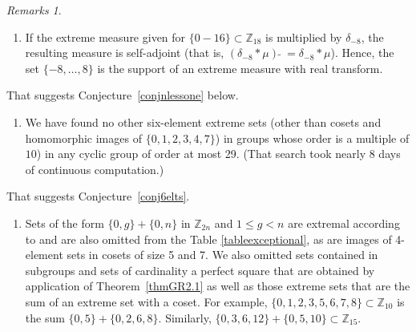 \documentclass[letter,11pt]{amsart}
\newcounter{keepenumi}%
\newcommand{\enumiget}{\setcounter{enumi}{\value{keepenumi}}}
\newcommand{\enumisave}{\setcounter{keepenumi}{\value{enumi}}}%
\numberwithin{theorem}{section}
\theoremstyle{remark}
\newtheorem{rems}[theorem]{Remarks}
\numberwithin{equation}{section}
\newcommand{\conjref}[1]{Conjecture~\ref{#1}}
\newcommand{\propref}[1]{Proposition~\ref{#1}}
\newcommand{\thmref}[1]{Theorem~\ref{#1}}
\newcommand\Zp[2]{\texttt{$\mathbb Z_{#1}^{\	#2}$}}
\begin{document}
\begin{rems}
\begin{enumerate}
We note that if $\mu$ above is multiplied by $\delta_{-8}$, the resulting measure is
self-adjoint (that is, $(\delta_{-8}*\mu)\widetilde{\ \ } =\delta_{-8}*\mu$). Hence, the set 
$\{-8,\dots,8\}$ is the support of an extreme measure with real transform. 

A similar thought worked for  5th (resp. 3rd) roots of unity in the case of 
16 elements in \Zp{17}{} (resp. 19 elements in \Zp{20}{}).

In general, if $k$ has a small factor, $j$, then there is the  possibility that $j$th roots will appear
as masses of an extreme measure on the set of $k+1$ elements 
in \Zp{k+2}{} and be quick for the computer to find if $j$ is sufficiently small.
  That won't work for 12 elements
in \Zp{13} nor for 18 elements in \Zp{19}{}.


\item If the extreme measure given for $\{0-16\}\subset\Zp{18}{}$ is multiplied by $\delta_{-8}$, the resulting measure is
self-adjoint (that is, $(\delta_{-8}*\mu)\widetilde{\ \ } =\delta_{-8}*\mu$). Hence, the set 
$\{-8,\dots,8\}$ is the support of an extreme measure with real transform. 

\enumisave
\end{enumerate}

\medbreak

That  suggests \conjref{conjnlessone} below.


\medbreak


\begin{enumerate}\enumiget


\item We have found no other six-element extreme sets (other than cosets and homomorphic images of $\{0,1,2,3,4,7\}$) in groups whose order is a multiple of $10$) in any cyclic group of order at most 29. (That search took nearly 8 days of continuous computation.)

\enumisave
\end{enumerate}

\medbreak
 That suggests \conjref{conj6elts}.
 
\medbreak

\begin{enumerate}\enumiget


\item Sets of the form $\{0,g\}+\{0, n\}$ in \Zp{2n}{} and $1\le g<n$ are extremal according to 
 \cite[Theorem 2.1]{MR627683} and are also omitted from the Table \ref{tableexceptional},
 as are  images of 4-element sets in cosets of size 5 and 7.
We also omitted sets contained in subgroups and sets of cardinality a perfect square that
are obtained by application of  \thmref{thmGR2.1} as well as
 those extreme sets that are the sum of an extreme set with a coset. For example,
$\{0,1,2,3,5,6,7,8\}\subset \Zp{10}{}$ is the sum $\{0,5\}+\{0,2,6,8\}$. 
Similarly, 
$\{0,3,6,12\}+\{0,5,10\}\subset \Zp{15}{}$.  


\end{enumerate}
\end{rems}
\end{document}
